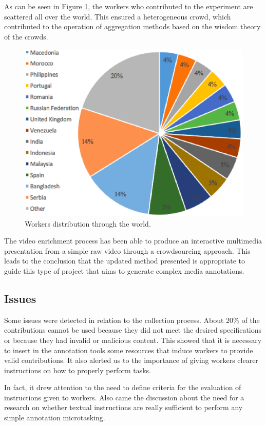 As can be seen in Figure \ref{workers}, the workers who contributed to the experiment are scattered all over the world. This ensured a heterogeneous crowd, which contributed to the operation of aggregation methods based on the wisdom theory of the crowds.
\begin{figure}[h]
	\centerline{\includegraphics[scale=0.3] {figure/workers_2}}
	\caption{Workers distribution through the world.}
	\label{workers}
\end{figure}

The video enrichment process has been able to produce an interactive multimedia presentation from a simple raw video through a crowdsourcing approach. This leads to the conclusion that the updated method presented is appropriate to guide this type of project that aims to generate complex media annotations.

\subsection{Issues}
Some issues were detected in relation to the collection process. About 20\% of the contributions cannot be used because they did not meet the desired specifications or because they had invalid or malicious content. This showed that it is necessary to insert in the annotation tools some resources that induce workers to provide valid contributions. It also alerted us to the importance of giving workers clearer instructions on how to properly perform tasks.

In fact, it drew attention to the need to define criteria for the evaluation of instructions given to workers. Also came the discussion about the need for a research on whether textual instructions are really sufficient to perform any simple annotation microtasking.

